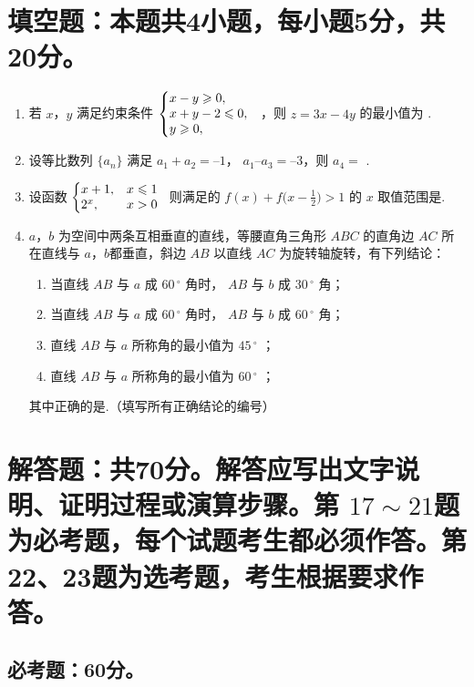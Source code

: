 \documentclass[12pt,space]{ctexart} %
\begin{document}
\section{填空题：本题共4小题，每小题5分，共20分。}
\begin{enumerate}[itemsep=-0.3em,topsep=0pt,resume]%
\item  若 $x$，$y$ 满足约束条件 $\left\{\begin{array}{@{}l}
x-y\geqslant0,\\x+y-2\leqslant0,\\y\geqslant0,
\end{array}\right.$
，则 $z=3x-4y$ 的最小值为 .

\item 设等比数列 $\{a_n\}$ 满足 $a_1+a_2=–1$， $a_1–a_3=–3$，则 $a_4=$ .

\item 设函数 $\biggl\lbrace\begin{array}{@{}ll}
x+1,&x\leqslant1\\2^x,&x>0
\end{array}$ 则满足的 $f(x)+f\big(x-\tfrac{1}{2}\big)>1$ 的 $x$ 取值范围是.
\item $a$，$b$ 为空间中两条互相垂直的直线，等腰直角三角形 $ABC$ 的直角边 $AC$ 所在直线与 $a$，$b$都垂直，斜边 $AB$ 以直线 $AC$ 为旋转轴旋转，有下列结论：
\begin{enumerate}[align=left,labelsep=-0.6em,leftmargin=1.2em,noitemsep,topsep=0pt]
	\item[\ding{172}] 当直线 $AB$ 与 $a$ 成 $60\,^{\circ}$ 角时， $AB$ 与 $b$ 成 $30\,^{\circ}$ 角；
	\item[\ding{173}] 当直线 $AB$ 与 $a$ 成 $60\,^{\circ}$ 角时， $AB$ 与 $b$ 成 $60\,^{\circ}$ 角；
	\item[\ding{174}] 直线 $AB$ 与 $a$ 所称角的最小值为 $45\,^{\circ}$ ；
	\item[\ding{175}] 直线 $AB$ 与 $a$ 所称角的最小值为 $60\,^{\circ}$ ；
\end{enumerate}
其中正确的是.（填写所有正确结论的编号）
\end{enumerate}

\section{解答题：共70分。解答应写出文字说明、证明过程或演算步骤。第 $17\sim21$题为必考题，每个试题考生都必须作答。第22、23题为选考题，考生根据要求作答。}
\subsection{必考题：60分。}
\end{document}
